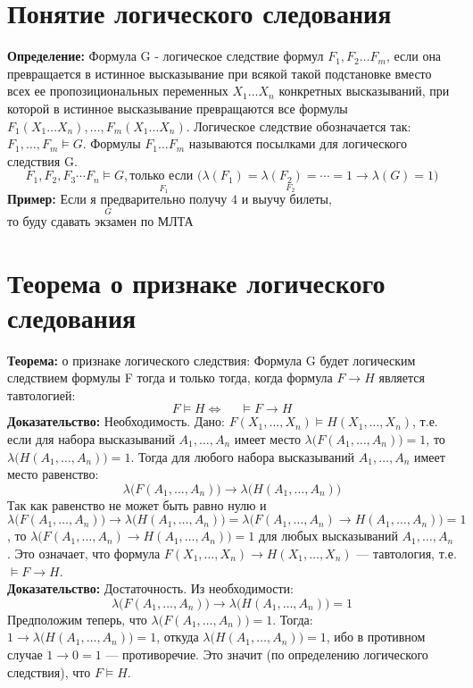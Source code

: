 \documentclass[../main.tex]{subfiles}
\begin{document}
\section{Понятие логического следования}
\textbf{Определение:
} Формула G - логическое следствие формул $F_1, F_2 \ldots F_m$, если она превращается в истинное высказывание при всякой такой подстановке вместо всех ее пропозициональных переменных ${X_1 \ldots X_n}$ конкретных высказываний, при которой в истинное высказывание превращаются все формулы $F_1(X_1 \ldots X_n),\ldots, F_m(X_1 \ldots X_n)$. Логическое следствие обозначается так: $F_1,\ldots,F_m\vDash G$. Формулы $F_1 \ldots F_m$ называются посылками для логического следствия G.
\[
    F_1, F_2, F_3 \cdots F_n \models G, \text {только если } \Big( \lambda (F_1) = \lambda (F_2) = \cdots = 1 \rightarrow \lambda (G) = 1 \Big)
\]
\textbf{
	Пример:
} Если $\stackrel{F_1}{\text{я предварительно получу 4}}$ и $\stackrel{F_2}{\text{выучу билеты}}$, \\то $\stackrel{G}{\text{буду сдавать экзамен по МЛТА}}$

\section{Теорема о признаке логического следования}
\textbf{Теорема:
} о признаке логического следствия: Формула G будет логическим следствием формулы F тогда и только тогда, когда формула $F\to H$ является тавтологией: 
\[F\vDash H\Leftrightarrow\ \quad \vDash F\to H\]
\textbf{
	Доказательство:
} Необходимость. Дано: $F(X_1,\ldots,X_n)\vDash H(X_1,\ldots,X_n)$, т.е. если для набора высказываний $A_1,\ldots,A_n$ имеет место $\lambda\bigl(F(A_1,\ldots,A_n)\bigr)=1$, то $\lambda\bigl(H(A_1,\ldots,A_n)\bigr)=1$. Тогда для любого набора высказываний $A_1,\ldots,A_n$ имеет место равенство:
\[\lambda\bigl(F(A_1,\ldots,A_n)\bigr)\to \lambda \bigl(H(A_1,\ldots,A_n)\bigr)\]
Так как равенство не может быть равно нулю и $\lambda\bigl(F(A_1,\ldots,A_n)\bigr)\to \lambda\bigl(H(A_1,\ldots,A_n)\bigr) = \lambda\bigl(F(A_1,\ldots,A_n)\to H(A_1,\ldots,A_n)\bigr)=1$, то $\lambda\bigl(F(A_1,\ldots,A_n)\to H(A_1,\ldots,A_n)\bigr)=1$ для любых высказываний $A_1,\ldots,A_n$. Это означает, что формула $F(X_1,\ldots,X_n)\to H(X_1,\ldots,X_n)$ — тавтология, т.е. $\vDash F\to H$. \\
\textbf{
Доказательство:
} Достаточность. Из необходимости:
\[\lambda\bigl(F(A_1,\ldots,A_n)\bigr)\to \lambda\bigl(H(A_1,\ldots,A_n)\bigr)=1\]
Предположим теперь, что $\lambda\bigl(F(A_1, \ldots, A_n)\bigr)=1$. Тогда: $1\to \lambda\bigl(H(A_1, \ldots, A_n)\bigr)=1$, откуда $\lambda\bigl(H(A_1,\ldots,A_n)\bigr)=1$, ибо в противном случае $1\to 0=1$ — противоречие. Это значит (по определению логического следствия), что $F\vDash H$.
\end{document}
